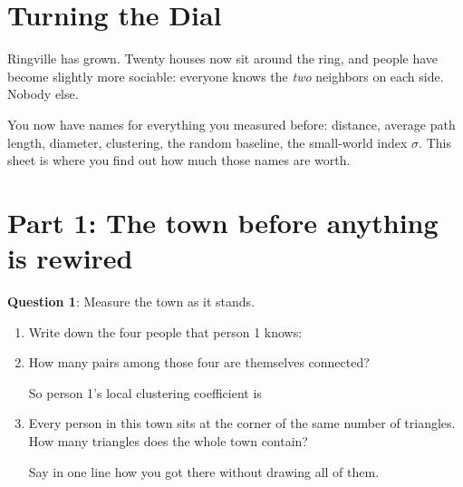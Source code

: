 \documentclass[a4paper, 14pt]{extarticle}
\begin{document}
\section*{Turning the Dial}

Ringville has grown. Twenty houses now sit around the ring, and people have
become slightly more sociable: everyone knows the \emph{two} neighbors on each
side. Nobody else.

\begin{center}
\end{center}

You now have names for everything you measured before: distance, average path
length, diameter, clustering, the random baseline, the small-world index
$\sigma$. This sheet is where you find out how much those names are worth.

\section*{Part 1: The town before anything is rewired}

{\bf Question 1}:
Measure the town as it stands.

\begin{enumerate}
    \item Write down the four people that person 1 knows:
          \underline{\hspace{5cm}}
    \item How many pairs among those four are themselves connected?
          \underline{\hspace{2cm}}

          So person 1's local clustering coefficient is
          \underline{\hspace{2cm}}
    \item Every person in this town sits at the corner of the same number of
          triangles. How many triangles does the whole town contain?
          \underline{\hspace{2cm}}

          Say in one line how you got there without drawing all of them.

          \underline{\hspace{\textwidth}}
\end{enumerate}
\end{document}
